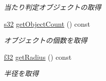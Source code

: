 \begin{DoxyCompactItemize}
\begin{DoxyCompactList}\small\item\em 当たり判定オブジェクトの取得 \end{DoxyCompactList}\item 
\hyperlink{_main_8h_a0ce6887c26c1c49ad3be5710dd42bfd6}{s32} \hyperlink{class_model_a4aed6bc0362c7e4a7fe4aaa773127820}{get\-Object\-Count} () const 
\begin{DoxyCompactList}\small\item\em オブジェクトの個数を取得 \end{DoxyCompactList}\item 
\hyperlink{_main_8h_a5f6906312a689f27d70e9d086649d3fd}{f32} \hyperlink{class_model_ab0ecbda9cdd50c9414cbc3df465f8d4f}{get\-Radius} () const 
\begin{DoxyCompactList}\small\item\em 半径を取得 \end{DoxyCompactList}\end{DoxyCompactItemize}


